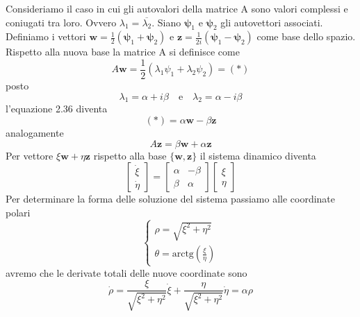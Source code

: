 \noindent Consideriamo il caso in cui gli autovalori della matrice A sono valori complessi e coniugati tra loro. Ovvero $\lambda_1 = \overline{\lambda_2}$. Siano $\bm{\psi}_1$ e $\bm{\psi}_2$ gli autovettori associati. Definiamo i vettori $\bm{w} = \frac{1}{2}(\bm{\psi}_1 + \bm{\psi}_2)$ e $\bm{z} = \frac{1}{2i}(\bm{\psi}_1 - \bm{\psi}_2)$ come base dello spazio. Rispetto alla nuova base la matrice A si definisce come
\begin{equation}
	A\bm{w} = \frac{1}{2}(\lambda_1 \psi_1 + \lambda_2 \psi_2) = (*)
\end{equation}
posto 
\begin{equation*}
	\lambda_1 = \alpha + i\beta \quad \text{e} \quad \lambda_2 = \alpha - i \beta
\end{equation*}
l'equazione 2.36 diventa 
\begin{equation*}
	(*) = \alpha \bm{w} - \beta \bm{z} 
\end{equation*}
analogamente 
\begin{equation*}
	A \bm{z} = \beta \bm{w} + \alpha \bm{z}
\end{equation*}
Per vettore $\xi \bm{w} + \eta \bm{z}$ rispetto alla base $\{ \bm{w},\bm{z}\}$ il sistema dinamico diventa 
\begin{equation}
	\left [  \begin{array}{c}
		\dot{\xi}\\
		\dot{\eta}
	\end{array} \right ] = 
	\left [  \begin{array}{cc}
		\alpha & -\beta\\
		\beta & \alpha
	\end{array} \right ] 
	\left [  \begin{array}{c}
		\xi\\
		\eta
	\end{array} \right ]
\end{equation}
Per determinare la forma delle soluzione del sistema passiamo alle coordinate polari 
\begin{equation*}
	\left \{ \begin{array}{l}
		\rho = \sqrt{\xi^2 + \eta^2}\\[0.1in]
		\theta = \text{arctg}\left (\frac{\xi}{\eta} \right )
	\end{array}\right.
\end{equation*}
\newpage
avremo che le derivate totali delle nuove coordinate sono
\begin{equation*}
	\dot{\rho} = \frac{\xi}{\sqrt{\xi^2 + \eta^2}}\dot{\xi} + \frac{\eta}{\sqrt{\xi^2 + \eta^2}}\dot{\eta} = \alpha \rho
\end{equation*}
